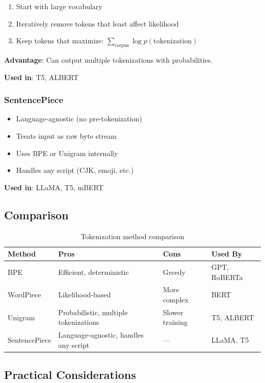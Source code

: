 \begin{enumerate}
    \item Start with large vocabulary
    \item Iteratively remove tokens that least affect likelihood
    \item Keep tokens that maximize: $\sum_{\text{corpus}} \log p(\text{tokenization})$
\end{enumerate}

\textbf{Advantage}: Can output multiple tokenizations with probabilities.

\textbf{Used in}: T5, ALBERT

\subsubsection{SentencePiece}

\begin{itemize}
    \item Language-agnostic (no pre-tokenization)
    \item Treats input as raw byte stream
    \item Uses BPE or Unigram internally
    \item Handles any script (CJK, emoji, etc.)
\end{itemize}

\textbf{Used in}: LLaMA, T5, mBERT

\subsection{Comparison}

\begin{table}[H]
\centering
\caption{Tokenization method comparison}
\begin{tabularx}{\textwidth}{lXXX}
\toprule
\textbf{Method} & \textbf{Pros} & \textbf{Cons} & \textbf{Used By} \\
\midrule
BPE & Efficient, deterministic & Greedy & GPT, RoBERTa \\
WordPiece & Likelihood-based & More complex & BERT \\
Unigram & Probabilistic, multiple tokenizations & Slower training & T5, ALBERT \\
SentencePiece & Language-agnostic, handles any script & — & LLaMA, T5 \\
\bottomrule
\end{tabularx}
\end{table}

\subsection{Practical Considerations}

